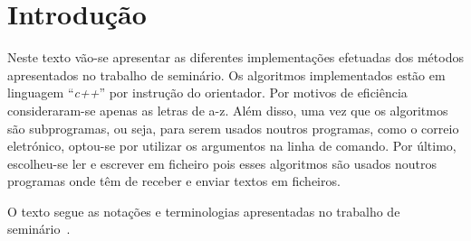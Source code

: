 \chapter{Introdução}
\label{sec:introducao}

Neste texto vão-se apresentar as diferentes implementações efetuadas dos métodos apresentados no trabalho de seminário.
Os algoritmos implementados estão em linguagem ``\emph{c++}'' por instrução do orientador. Por motivos de eficiência consideraram-se apenas as letras de a-z. Além disso, uma vez que os algoritmos são subprogramas, ou seja,  para serem usados noutros programas, como 
 o correio eletrónico, optou-se por utilizar os argumentos na linha de comando.
Por último, escolheu-se ler e escrever em ficheiro pois esses algoritmos são usados noutros programas onde têm de  receber e enviar textos em ficheiros.

O texto segue as notações e terminologias apresentadas no trabalho de seminário~\cite{Songo2024}.


